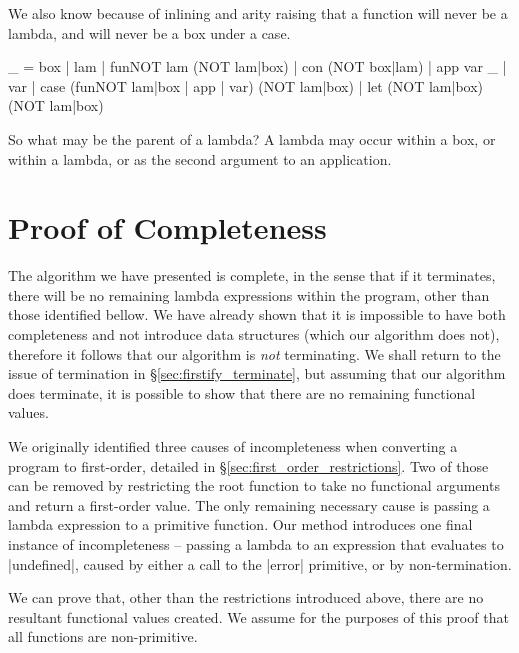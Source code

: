 \documentclass[preprint]{sigplanconf}
\begin{document}
We also know because of inlining and arity raising that a function will never be a lambda, and will never be a box under a case.

\begin{code}
_ = box | lam | fun{NOT lam} (NOT lam|box) | con (NOT box|lam) | app var  _ | var | case (fun{NOT lam|box} | app | var) (NOT lam|box) | let (NOT lam|box) (NOT lam|box)
\end{code}

So what may be the parent of a lambda? A lambda may occur within a box, or within a lambda, or as the second argument to an application.








\section{Proof of Completeness}


The algorithm we have presented is complete, in the sense that if it terminates, there will be no remaining lambda expressions within the program, other than those identified bellow. We have already shown that it is impossible to have both completeness and not introduce data structures (which our algorithm does not), therefore it follows that our algorithm is \textit{not} terminating. We shall return to the issue of termination in \S\ref{sec:firstify_terminate}, but assuming that our algorithm does terminate, it is possible to show that there are no remaining functional values.

We originally identified three causes of incompleteness when converting a program to first-order, detailed in \S\ref{sec:first_order_restrictions}. Two of those can be removed by restricting the root function to take no functional arguments and return a first-order value. The only remaining necessary cause is passing a lambda expression to a primitive function. Our method introduces one final instance of incompleteness -- passing a lambda to an expression that evaluates to |undefined|, caused by either a call to the |error| primitive, or by non-termination.

We can prove that, other than the restrictions introduced above, there are no resultant functional values created. We assume for the purposes of this proof that all functions are non-primitive.
\end{document}
